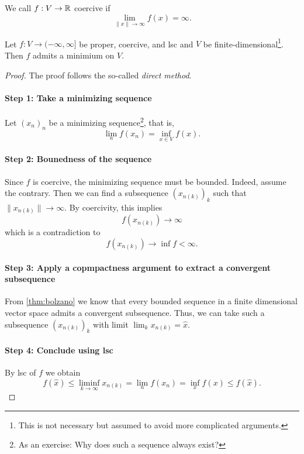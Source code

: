 \begin{defn}[Coercive]
    We call $f:V\rightarrow \mathbb{R}$ coercive if 
    \begin{equation}
        \lim_{\|x\|\rightarrow\infty} f(x) = \infty.
    \end{equation}
\end{defn}


\begin{theorem}\label{preliminaries:thm:direct_method}
    Let $f:V\rightarrow (-\infty,\infty]$ be proper, coercive, and lsc and $V$ be finite-dimensional\footnote{This is not necessary but assumed to avoid more complicated arguments.}. Then $f$ admits a minimium on $V$.
\end{theorem}
\begin{proof}
    The proof follows the so-called \emph{direct method}.
    \paragraph{Step 1: Take a minimizing sequence}
    Let $(x_n)_n$ be a minimizing sequence\footnote{As an exercise: Why does such a sequence always exist?}, that is, 
    \begin{equation}
        \lim_n f(x_n) = \inf_{x\in V} f(x).
    \end{equation}
    \paragraph{Step 2: Bounedness of the sequence}
    Since $f$ is coercive, the minimizing sequence must be bounded. Indeed, assume the contrary. Then we can find a subsequence $(x_{n(k)})_k$ such that $\|x_{n(k)}\|\rightarrow\infty$. By coercivity, this implies
    \begin{equation}
        f(x_{n(k)})\rightarrow\infty
    \end{equation}
    which is a contradiction to
    \begin{equation}
        f(x_{n(k)})\rightarrow \inf f<\infty.
    \end{equation}
    \paragraph{Step 3: Apply a copmpactness argument to extract a convergent subsequence}
    From \cref{thm:bolzano} we know that every bounded sequence in a finite dimensional vector space admits a convergent subsequence. Thus, we can take such a subsequence $(x_{n(k)})_k$ with limit $\lim_kx_{n(k)}=\hat x$.
    \paragraph{Step 4: Conclude using lsc}
    By lsc of $f$ we obtain
    \begin{equation}
        f(\hat x) \leq \liminf_{k\rightarrow \infty}x_{n(k)} = \lim_n f(x_n) = \inf_x f(x) \leq f(\hat{x}).
    \end{equation}
\end{proof}